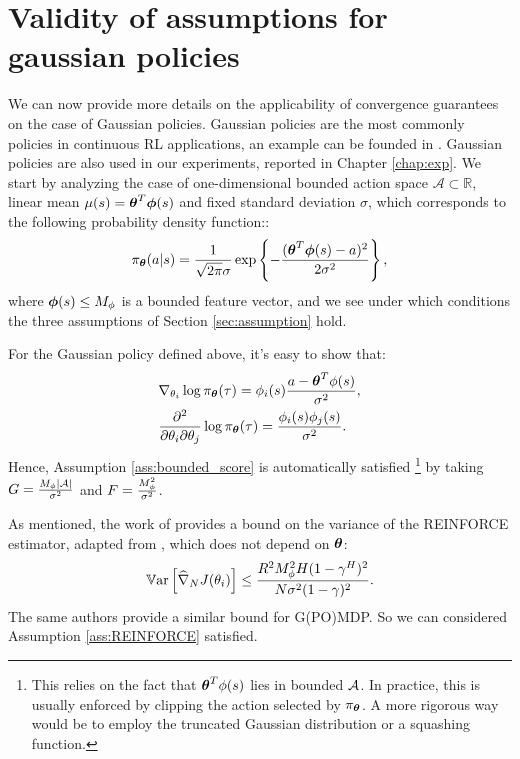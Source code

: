 \section{Validity of assumptions for gaussian policies}\label{sec:gaussianassumption}
We can now provide more details on the applicability of convergence guarantees on the case of Gaussian policies. Gaussian policies are the most commonly policies in continuous RL applications, an example can be founded in \cite{kober2013reinforcement}. Gaussian policies are also used in our experiments, reported in Chapter \ref{chap:exp}. We start by analyzing the case of one-dimensional bounded action space $\mathcal{A}\subset\mathbb{R}$, linear mean $\mu(s) = \vtheta^T\vphi(s)$ and fixed standard deviation $\sigma$, which corresponds to the following probability density function::
\[
\pi_{\vtheta}(a\vert s) = \frac{1}{\sqrt{2\pi}\sigma}\exp\left\{
-\frac{(\vtheta^T\vphi(s) - a)^2}{2\sigma^2}\right\},
\]
where $\vphi(s)\leq M_{\phi}$ is a bounded feature vector, and we see under which conditions the three assumptions of Section \ref{sec:assumption} hold.

For the Gaussian policy defined above, it's easy to show that:
\begin{align*}
&\nabla_{\theta_i}\log\pi_{\vtheta}(\tau) =  \phi_i(s)\frac{a-\vtheta^T\phi(s)}{\sigma^2},\\
&\frac{\partial^2}{\partial\theta_i\partial\theta_j}\log\pi_{\vtheta}(\tau) = \frac{\phi_i(s)\phi_j(s)}{\sigma^2}.
\end{align*}
Hence, Assumption \ref{ass:bounded_score} is automatically satisfied \footnote{This relies on the fact that $\vtheta^T\phi(s)$ lies in bounded $\Aspace$. In practice, this is usually enforced by clipping the action selected by $\pi_{\vtheta}$. A more rigorous way would be to employ the truncated Gaussian distribution or a squashing function.} by taking $\GRADLOG = \frac{M_{\phi}|\Aspace|}{\sigma^2}$ and $\HESSLOG = \frac{M_{\phi}^2}{\sigma^2}$.
\par

As mentioned, the work of \cite{pirotta2013adaptive} provides a bound on the variance of the REINFORCE estimator, adapted from \cite{zhao2011analysis}, which does not depend on $\vtheta$:
\begin{align*}
\Var\left[\gradApp{\theta_i}{N}\right] \leq \frac{R^2M_{\phi}^2H(1-\gamma^H)^2}{N\sigma^2(1-\gamma)^2}.
\end{align*}
The same authors provide a similar bound for G(PO)MDP. So we can considered Assumption \ref{ass:REINFORCE} satisfied.


